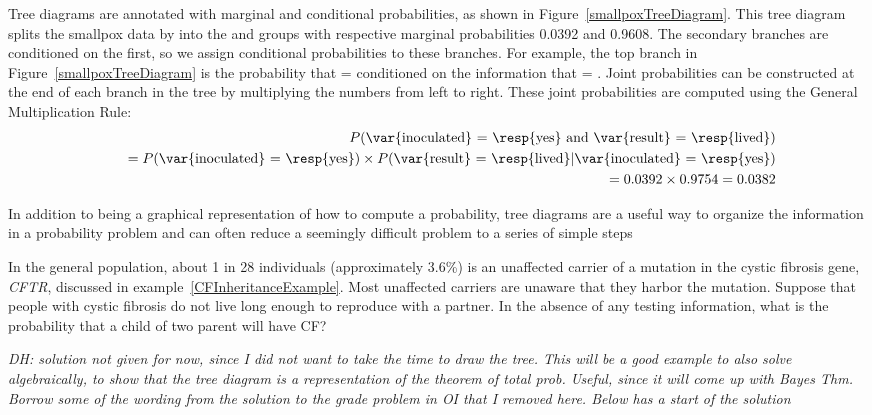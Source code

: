 \begin{doublespace}
Tree diagrams are annotated with marginal and conditional probabilities, as shown in Figure~\ref{smallpoxTreeDiagram}. This tree diagram splits the smallpox data by  into the  and  groups with respective marginal probabilities 0.0392 and 0.9608. The secondary branches are conditioned on the first, so we assign conditional probabilities to these branches. For example, the top branch in Figure~\ref{smallpoxTreeDiagram} is the probability that  =  conditioned on the information that  = . Joint probabilities can be constructed at the end of each branch in the tree by multiplying the numbers from left to right. These joint probabilities are computed using the General Multiplication Rule:
\begin{eqnarray*}
&& P(\text{\var{inoculated} = \resp{yes} and \var{result} = \resp{lived}}) \\
	&&\quad = P(\text{\var{inoculated} = \resp{yes}})\times P(\text{\var{result} = \resp{lived}}|\text{\var{inoculated} = \resp{yes}}) \\
	&&\quad = 0.0392\times 0.9754=0.0382
\end{eqnarray*}


In addition to being a graphical representation of how to compute a probability, tree diagrams are a useful way to organize the information in a probability problem and can often reduce a seemingly difficult problem to a series of simple steps

\begin{example}  

In the general population, about 1 in 28 individuals (approximately 3.6\%) is an unaffected carrier of a mutation in the cystic fibrosis gene, \textit{CFTR}, discussed in example~\ref{CFInheritanceExample}.  Most unaffected carriers are unaware that they harbor the mutation.  Suppose that people with cystic fibrosis do not live long enough to reproduce with a partner.  In the absence of any testing information, what is the probability that a child of two parent will have CF?
	
	\textit{DH: solution not given for now, since I did not want to take the time to draw the tree.  This will be a good example to also solve algebraically, to show that the tree diagram is a representation of the theorem of total prob. Useful, since it will come up with Bayes Thm. Borrow some of the wording from the solution to the grade problem in OI that I removed here.  Below has a start of the solution}
	

\end{example}
\end{doublespace}
